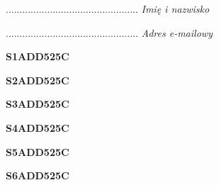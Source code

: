 \begin{turn}{90}\begin{minipage}{\linewidth} \vspace{20mm} ................................................  \textit{Imię i nazwisko}\end{minipage}\end{turn}

\begin{turn}{90}\begin{minipage}{\linewidth} \vspace{20mm} ................................................  \textit{Adres e-mailowy}\end{minipage}\end{turn}

\begin{turn}{90}\huge \begin{minipage}{\linewidth} \vspace{10mm}\textbf{S1ADD525C}\end{minipage}\end{turn}

\begin{turn}{90}\huge \begin{minipage}{\linewidth} \vspace{10mm}\textbf{S2ADD525C}\end{minipage}\end{turn}

\begin{turn}{90}\huge \begin{minipage}{\linewidth} \vspace{10mm}\textbf{S3ADD525C}\end{minipage}\end{turn}

\begin{turn}{90}\huge \begin{minipage}{\linewidth} \vspace{10mm}\textbf{S4ADD525C}\end{minipage}\end{turn}

\begin{turn}{90}\huge \begin{minipage}{\linewidth} \vspace{10mm}\textbf{S5ADD525C}\end{minipage}\end{turn}

\begin{turn}{90}\huge \begin{minipage}{\linewidth} \vspace{10mm}\textbf{S6ADD525C}\end{minipage}\end{turn}

